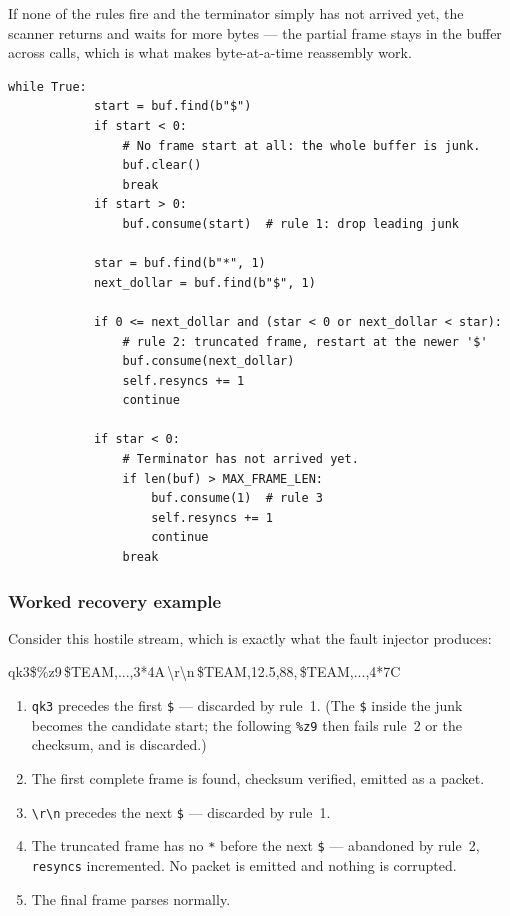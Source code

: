 \documentclass[11pt,a4paper]{article}
\newcommand{\file}[1]{\texttt{#1}}
\newcommand{\code}[1]{\texttt{#1}}
\begin{document}
If none of the rules fire and the terminator simply has not arrived yet, the
scanner returns and waits for more bytes --- the partial frame stays in the
buffer across calls, which is what makes byte-at-a-time reassembly work.

\begin{lstlisting}[caption={Frame-sync loop, from \file{serial\_worker.py}.},label={lst:framesync}]
        while True:
            start = buf.find(b"$")
            if start < 0:
                # No frame start at all: the whole buffer is junk.
                buf.clear()
                break
            if start > 0:
                buf.consume(start)  # rule 1: drop leading junk

            star = buf.find(b"*", 1)
            next_dollar = buf.find(b"$", 1)

            if 0 <= next_dollar and (star < 0 or next_dollar < star):
                # rule 2: truncated frame, restart at the newer '$'
                buf.consume(next_dollar)
                self.resyncs += 1
                continue

            if star < 0:
                # Terminator has not arrived yet.
                if len(buf) > MAX_FRAME_LEN:
                    buf.consume(1)  # rule 3
                    self.resyncs += 1
                    continue
                break
\end{lstlisting}

\subsubsection{Worked recovery example}

Consider this hostile stream, which is exactly what the fault injector
produces:

\begin{center}
\ttfamily\footnotesize
\textcolor{gcsgrey}{qk3\$\%z9}\,\textcolor{fsmImpact}{\$TEAM,...,3*4A}\,\textbackslash r\textbackslash n\,\textcolor{fsmDeploy}{\$TEAM,12.5,88,}\,\textcolor{fsmImpact}{\$TEAM,...,4*7C}
\end{center}

\begin{enumerate}
  \item \textcolor{gcsgrey}{\texttt{qk3}} precedes the first \code{\$} ---
        discarded by rule~1. (The \code{\$} inside the junk becomes the
        candidate start; the following \code{\%z9} then fails rule~2 or the
        checksum, and is discarded.)
  \item \textcolor{fsmImpact}{The first complete frame} is found, checksum
        verified, emitted as a packet.
  \item \code{\textbackslash r\textbackslash n} precedes the next \code{\$}
        --- discarded by rule~1.
  \item \textcolor{fsmDeploy}{The truncated frame} has no \code{*} before the
        next \code{\$} --- abandoned by rule~2, \code{resyncs} incremented.
        No packet is emitted and nothing is corrupted.
  \item \textcolor{fsmImpact}{The final frame} parses normally.
\end{enumerate}
\end{document}

